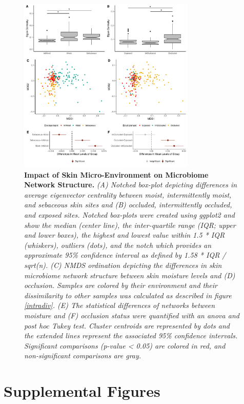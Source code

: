 \documentclass[12pt,]{article}
\begin{document}
\begin{figure}[htbp]
\centering
\includegraphics[width=0.75000\textwidth]{../figures/skinplotresults.pdf}
\caption{\textbf{Impact of Skin Micro-Environment on Microbiome Network
Structure.} \emph{(A) Notched box-plot depicting differences in average
eigenvector centrality between moist, intermittently moist, and
sebaceous skin sites and (B) occluded, intermittently occluded, and
exposed sites. Notched box-plots were created using ggplot2 and show the
median (center line), the inter-quartile range (IQR; upper and lower
boxes), the highest and lowest value within 1.5 * IQR (whiskers),
outliers (dots), and the notch which provides an approximate 95\%
confidence interval as defined by 1.58 * IQR / sqrt(n). (C) NMDS
ordination depicting the differences in skin microbiome network
structure between skin moisture levels and (D) occlusion. Samples are
colored by their environment and their dissimilarity to other samples
was calculated as described in figure \ref{intradiv}. (E) The
statistical differences of networks between moisture and (F) occlusion
status were quantified with an anova and post hoc Tukey test. Cluster
centroids are represented by dots and the extended lines represent the
associated 95\% confidence intervals. Significant comparisons (p-value
\textless{} 0.05) are colored in red, and non-significant comparisons
are gray.}\label{skinnetwork}}
\end{figure}

\newpage

\section{Supplemental Figures}\label{supplemental-figures}
\end{document}
